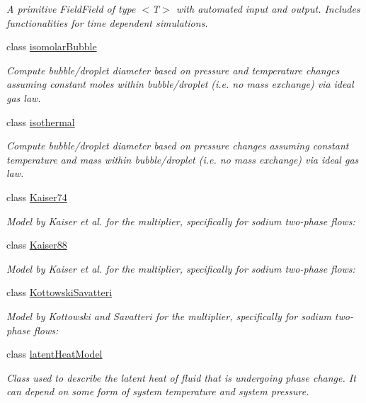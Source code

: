 \begin{DoxyCompactItemize}
\begin{DoxyCompactList}\small\item\em A primitive Field\+Field of type $<$T$>$ with automated input and output. Includes functionalities for time dependent simulations. \end{DoxyCompactList}\item 
class \hyperlink{classFoam_1_1isomolarBubble}{isomolar\+Bubble}
\begin{DoxyCompactList}\small\item\em Compute bubble/droplet diameter based on pressure and temperature changes assuming constant moles within bubble/droplet (i.\+e. no mass exchange) via ideal gas law. \end{DoxyCompactList}\item 
class \hyperlink{classFoam_1_1isothermal}{isothermal}
\begin{DoxyCompactList}\small\item\em Compute bubble/droplet diameter based on pressure changes assuming constant temperature and mass within bubble/droplet (i.\+e. no mass exchange) via ideal gas law. \end{DoxyCompactList}\item 
class \hyperlink{classFoam_1_1Kaiser74}{Kaiser74}
\begin{DoxyCompactList}\small\item\em Model by Kaiser et al. for the multiplier, specifically for sodium two-\/phase flows\+: \end{DoxyCompactList}\item 
class \hyperlink{classFoam_1_1Kaiser88}{Kaiser88}
\begin{DoxyCompactList}\small\item\em Model by Kaiser et al. for the multiplier, specifically for sodium two-\/phase flows\+: \end{DoxyCompactList}\item 
class \hyperlink{classFoam_1_1KottowskiSavatteri}{Kottowski\+Savatteri}
\begin{DoxyCompactList}\small\item\em Model by Kottowski and Savatteri for the multiplier, specifically for sodium two-\/phase flows\+: \end{DoxyCompactList}\item 
class \hyperlink{classFoam_1_1latentHeatModel}{latent\+Heat\+Model}
\begin{DoxyCompactList}\small\item\em Class used to describe the latent heat of fluid that is undergoing phase change. It can depend on some form of system temperature and system pressure. \end{DoxyCompactList}\item 

\end{DoxyCompactItemize}
